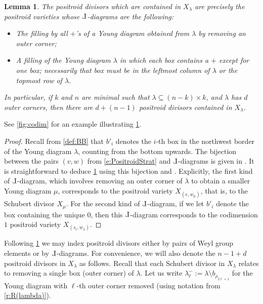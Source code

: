 \documentclass{amsart}
\def\Le{\hbox{\rotatebox[origin=c]{180}{$\Gamma$}}}
\newtheorem{lemma}[thm]{Lemma}
\theoremstyle{definition}
\numberwithin{equation}{section}
\begin{document}
\begin{lemma}\label{lem:codim1}
The positroid divisors which are contained in $X_\lambda$ are 
precisely the positroid varieties whose $\Le$-diagrams are the following:
\begin{itemize}
\item The filling by all $+$'s of 
a Young diagram obtained from $\lambda$ by removing an outer corner;
\item A filling of the Young diagram $\lambda$ 
	in which each box contains a $+$
	except for one box; necessarily 
		that box must be in the leftmost column
		of $\lambda$ or the topmost row of $\lambda$.
	\end{itemize}
In particular, if $k$ and $n$ are minimal such that $\lambda \subseteq (n-k)\times k$,
	and $\lambda$ has $d$ outer corners, then there are $d+(n-1)$
	positroid divisors contained in $X_{\lambda}$.
\end{lemma}
See \cref{fig:codim} for an example 
illustrating \cref{lem:codim1}.


\begin{proof} 
Recall from \cref{def:BB}
that $b'_i$ denotes 
the $i$-th box in the northwest border of the Young diagram $\lambda$,
counting from the bottom upwards.
The bijection between the pairs $(v,w)$ from \eqref{e:PositroidStrat} and $\Le$-diagrams  is given in \cite[Section 19]{Postnikov}. It is straightforward to deduce \cref{lem:codim1} using this bijection and \cite{RietschClosure}. Explicitly, the first kind of $\Le$-diagram, which involves removing an outer corner of $\lambda$ to obtain a smaller Young diagram $\mu$,  corresponds to the positroid variety $X_{(e,w_\mu)}$, that is, to the Schubert divisor $X_\mu$. For 
	the second kind of $\Le$-diagram, if we let $b'_i$ denote
	the box containing the unique $0$, then this $\Le$-diagram
	corresponds to the codimension $1$ positroid variety $X_{(s_i,w_\lambda)}$.
\end{proof}

Following 
\cref{lem:codim1}
we may index positroid divisors either by pairs of Weyl group elements or by $\Le$-diagrams. For convenience, we will also denote the $n-1+d$ positroid divisors in $X_{\lambda}$ as follows. Recall that each Schubert divisor in $X_\lambda$ relates to removing a single box (outer corner) of $\lambda$. Let us write $\lambda^-_\ell:=\lambda \setminus b_{\rho_{2\ell+1}}$ for the Young diagram with $\ell$-th outer corner removed (using notation from  \cref{r:R(lambda)}). 
\end{document}
